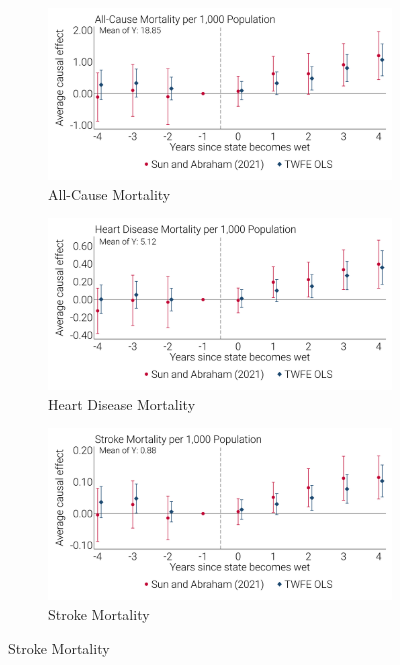 \documentclass[12pt]{article}
\begin{document}
\newpage 
{}
\begin{landscape}
\begin{figure}[!ht]
    \caption[Event Studies By Cause of Death)]{Event Studies By Cause of Death}
    \centering
    \begin{subfigure}{0.49\linewidth}
        \centering 
        \caption[All-Cause Mortality]{All-Cause Mortality}        
        \includegraphics[width=1.0\linewidth]{../analysis/output/main/figure_2a_event_study_deaths.png}
    \end{subfigure}
    \begin{subfigure}{0.49\linewidth}
        \centering 
        \caption[Heart Disease Mortality]{Heart Disease Mortality}        
        \includegraphics[width=1.0\linewidth]{../analysis/output/main/figure_2b_event_study_heart.png}
    \end{subfigure}
    \begin{subfigure}{0.49\linewidth}
        \centering 
        \caption[Stroke Mortality]{Stroke Mortality}        
        \includegraphics[width=1.0\linewidth]{../analysis/output/main/figure_2c_event_study_stroke.png}

\end{subfigure}
\end{figure}
\end{landscape}
\end{document}
